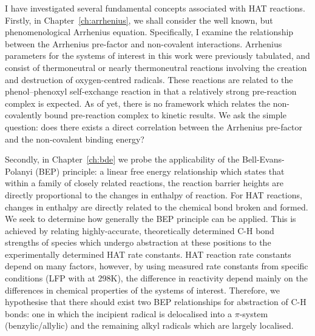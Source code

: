 I have investigated several fundamental concepts associated with HAT reactions. Firstly, in Chapter~\ref{ch:arrhenius}, we shall consider the well known, but phenomenological Arrhenius equation. Specifically, I examine the relationship between the Arrhenius pre-factor and non-covalent interactions. Arrhenius parameters for the systems of interest in this work were previously tabulated,\cite{DiLabio2005} and consist of thermoneutral or nearly thermoneutral reactions involving the creation and destruction of oxygen-centred radicals. These reactions are related to the phenol--phenoxyl self-exchange reaction in that a relatively strong pre-reaction complex is expected. As of yet, there is no framework which relates the non-covalently bound pre-reaction complex to kinetic results. We ask the simple question: does there exists a direct correlation between the Arrhenius pre-factor and the non-covalent binding energy?

Secondly, in Chapter~\ref{ch:bde} we probe the applicability of the Bell-Evans-Polanyi (BEP) principle: a linear free energy relationship which states that within a family of closely related reactions, the reaction barrier heights are directly proportional to the changes in enthalpy of reaction. For HAT reactions, changes in enthalpy are directly related to the chemical bond broken and formed. We seek to determine how generally the BEP principle can be applied. This is achieved by relating highly-accurate, theoretically determined C-H bond strengths of species which undergo abstraction at these positions to the experimentally determined HAT rate constants. HAT reaction rate constants depend on many factors, however, by using measured rate constants from specific conditions (LFP with \cumo at 298K), the difference in reactivity depend mainly on the differences in chemical properties of the systems of interest. Therefore, we hypothesise that there should exist two BEP relationships for abstraction of C-H bonds: one in which the incipient radical is delocalised into a $\pi$-system (benzylic/allylic) and the remaining alkyl radicals which are largely localised.


